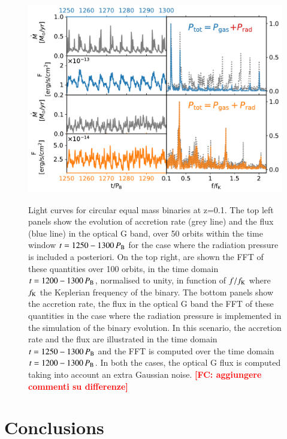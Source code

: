 \documentclass{aa}
\newcommand{\fc}[1]{\textcolor{red}{\bf [FC: #1]}}
\begin{document}
\begin{figure}[h]
    \begin{center}
    \includegraphics[width=\columnwidth ]{Fig/Results/e0q1_hr01_md001OpticAll_Flux_bands_10000_0.1_comparisonPgasPras.pdf} \\
    \caption{Light curves for circular equal mass binaries at z=0.1. The top left panels show the evolution of accretion rate (grey line) and the flux (blue line) in the optical G band, over 50 orbits within the time window $t=1250-1300 \, P_{\rm B}$ for the case where the radiation pressure is included a posteriori. On the top right, are shown the FFT of these quantities over 100 orbits, in the time domain $t=1200-1300 \, P_{\rm B}$, normalised to unity, in function of $f/f_{\rm K}$ where $f_{\rm K}$ the Keplerian frequency of the binary. The bottom panels show the accretion rate, the flux in the optical G band the FFT of these quantities in the case where the radiation pressure is implemented in the simulation of the binary evolution. In this scenario, the accretion rate and the flux are illustrated in the time domain $t=1250-1300 \, P_{\rm B}$ and the FFT is computed over the time domain $t=1200-1300 \, P_{\rm B}$. In both the cases, the optical G flux is computed taking into account an extra Gaussian noise. \fc{aggiungere commenti su differenze}}
    \label{fig:LCs_FFT}  
    \end{center}
\end{figure}


\section{Conclusions}
\label{sec:conclusions}
\end{document}
